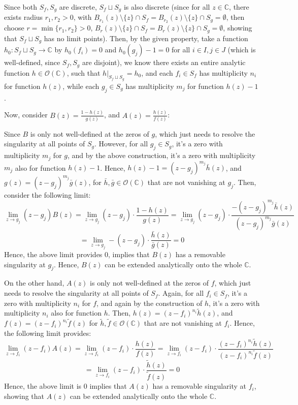 \documentclass{article}
\begin{document}
\begin{itemize}
    \hfil

    Since both $S_f,S_g$ are discrete, $S_f\sqcup S_g$ is also discrete (since for all $z\in\mathbb{C}$, there exists radius $r_1,r_2>0$, with $B_{r_1}(z)\setminus\{z\}\cap S_f=B_{r_2}(z)\setminus\{z\}\cap S_g=\emptyset$, then choose $r=\min\{r_1,r_2\}>0$, $B_r(z)\setminus\{z\}\cap S_f=B_r(z)\setminus\{z\}\cap S_g=\emptyset$, showing that $S_f\sqcup S_g$ has no limit points).
    Then, by the given property, take a function $h_0:S_f\sqcup S_g\rightarrow\mathbb{C}$ by $h_0(f_i)=0$ and $h_0(g_j)-1=0$ for all $i\in I,j\in J$ (which is well-defined, since $S_f,S_g$ are disjoint), we know there exists an entire analytic function $h\in\mathcal{O}(\mathbb{C})$, such that $h|_{S_f\sqcup S_g}=h_0$, and each $f_i\in S_f$ has multiplicity $n_i$ for function $h(z)$, while each $g_j\in S_g$ has multiplicity $m_j$ for function $h(z)-1$.

    \hfil

    Now, consider $B(z)=\frac{1-h(z)}{g(z)}$, and $A(z)=\frac{h(z)}{f(z)}$: 

    Since $B$ is only not well-defined at the zeros of $g$, which just needs to resolve the singularity at all points of $S_g$. However, for all $g_j\in S_g$, it's a zero with multiplicity $m_j$ for $g$, and by the above construction, it's a zero with multiplicity $m_j$ also for function $h(z)-1$.
    Hence, $h(z)-1=(z-g_j)^{m_j}\bar{h}(z)$, and $g(z)=(z-g_j)^{m_j}\bar{g}(z)$, for $\bar{h},\bar{g}\in\mathcal{O}(\mathbb{C})$ that are not vanishing at $g_j$. Then, consider the following limit:
    $$\lim_{z\rightarrow g_j}(z-g_j)B(z)=\lim_{z\rightarrow g_j}(z-g_j)\cdot\frac{1-h(z)}{g(z)}=\lim_{z\rightarrow g_j}(z-g_j)\cdot\frac{-(z-g_j)^{m_j}\bar{h}(z)}{(z-g_j)^{m_j}\bar{g}(z)}$$
    $$=\lim_{z\rightarrow g_j}-(z-g_j)\cdot\frac{\bar{h}(z)}{\bar{g}(z)}=0$$
    Hence, the above limit provides $0$, implies that $B(z)$ has a removable singularity at $g_j$. Hence, $B(z)$ can be extended analytically onto the whole $\mathbb{C}$.

    On the other hand, $A(z)$ is only not well-defined at the zeros of $f$, which just needs to resolve the singularity at all points of $S_f$. Again, for all $f_i\in S_f$, it's a zero with multiplicity $n_i$ for $f$, and again by the construction of $h$, it's a zero with multiplicity $n_i$ also for function $h$.
    Then, $h(z)=(z-f_i)^{n_i}\tilde{h}(z)$, and $f(z)=(z-f_i)^{n_i}\tilde{f}(z)$ for $\tilde{h},\tilde{f}\in\mathcal{O}(\mathbb{C})$ that are not vanishing at $f_i$. Hence, the following limit provides:
    $$\lim_{z\rightarrow f_i}(z-f_i)A(z)=\lim_{z\rightarrow f_i}(z-f_i)\cdot\frac{h(z)}{f(z)}=\lim_{z\rightarrow f_i}(z-f_i)\cdot\frac{(z-f_i)^{n_i}\tilde{h}(z)}{(z-f_i)^{n_i}\tilde{f}(z)}$$
    $$=\lim_{z\rightarrow f_i}(z-f_i)\cdot\frac{\tilde{h}(z)}{\tilde{f}(z)}=0$$
    Hence, the above limit is $0$ implies that $A(z)$ has a removable singularity at $f_i$, showing that $A(z)$ can be extended analytically onto the whole $\mathbb{C}$.


\end{itemize}
\end{document}
